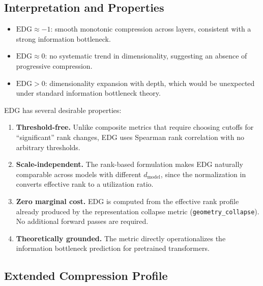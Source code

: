 \documentclass{article}
\begin{document}
\subsection{Interpretation and Properties}
\label{sec:edg-properties}

\begin{itemize}
  \item $\text{EDG} \approx -1$: smooth monotonic compression across layers, consistent with a strong information bottleneck.
  \item $\text{EDG} \approx 0$: no systematic trend in dimensionality, suggesting an absence of progressive compression.
  \item $\text{EDG} > 0$: dimensionality expansion with depth, which would be unexpected under standard information bottleneck theory.
\end{itemize}

\noindent EDG has several desirable properties:

\begin{enumerate}
  \item \textbf{Threshold-free.} Unlike composite metrics that require choosing cutoffs for ``significant'' rank changes, EDG uses Spearman rank correlation with no arbitrary thresholds.
  \item \textbf{Scale-independent.} The rank-based formulation makes EDG naturally comparable across models with different $d_{\text{model}}$, since the normalization in  converts effective rank to a utilization ratio.
  \item \textbf{Zero marginal cost.} EDG is computed from the effective rank profile already produced by the representation collapse metric (\texttt{geometry\_collapse}). No additional forward passes are required.
  \item \textbf{Theoretically grounded.} The metric directly operationalizes the information bottleneck prediction for pretrained transformers.
\end{enumerate}

\subsection{Extended Compression Profile}
\label{sec:edg-extended}
\end{document}
